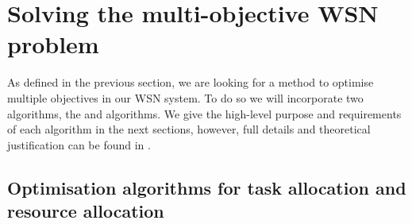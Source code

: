 \section{Solving the multi-objective WSN problem}
\label{section:solution}
As defined in the previous section, we are looking for a method to optimise multiple objectives in our WSN system. To do so we will incorporate two algorithms, the \acronymATARIAExtended{}{} and \acronymMGRAOExtended{}{} algorithms. We give the high-level purpose and requirements of each algorithm in the next sections, however, full details and theoretical justification can be found in \cite{creech2021dynamic, creech2021resource}.

\subsection{Optimisation algorithms for task allocation and resource allocation}
\label{section:algorithm_summaries}
\newcommand{\varAction}[2]{\varSymbol{a}{#1}{#2}}
\newcommand{\functionExec}[2]{\texttt{exec}(\varAtomicTask{}{})}
\newcommand{\functionAlloc}[2]{\texttt{alloc}(\varAtomicTask{}{}, \varAgent{}{})}
\newcommand{\functionInfo}[2]{\texttt{info}(\varAgent{}{})}
\newcommand{\functionLink}[2]{\texttt{link}(\varAgent{}{})}
\newcommand{\functionATARIA}[2]{
	\functionSignature{
		ataria_{\varAgent{}{}}
	}{
		\varAtomicTask{}{}, \varAgent{self}{}
	}
}	
\newcommand{\formalATARIA}[2]{
	\functionFormal{\texttt{ataria}_{\varAgent{}{}}}
	{\setAtomicTask{}{} \times \setAgents{}{}}
	{
	\texttt{exec}(\setAtomicTask{}{})
	\times \texttt{alloc}(\setAtomicTask{}{}, \setAgents{}{})
	\times \texttt{info}(\setAgents{}{})
	\times \texttt{link}(\setAgents{}{})
}
}
\newcommand{\functionMGRAOWeighting}[2]{\texttt{mgrao-weight}(\varAtomicTask{}{}, \varAgent{self}{})}
\newcommand{\formalMGRAOWeighting}[2]{
	\functionFormal{\texttt{mgrao-weight}_{\varAgent{}{}}}
	{\setAtomicTask{}{} \times \setRealNumbers{}{}}
	{
		\setRealNumbers{}{}
	}
}
\newcommand{\functionMGRAOUpdate}[2]{
	\texttt{mgrao-update}_{\varAgent{}{}}
	(\varAtomicTask{}{}, \functionTaskAbsoluteValue{}{})}
\newcommand{\formalMGRAOUpdate}[2]{
	\functionFormal{\texttt{mgrao-update}_{\varAgent{}{}}}
	{\setAtomicTask{}{} \times \setRealNumbers{}{}}
	{
		\setRealNumbers{}{}
	}
}
	
